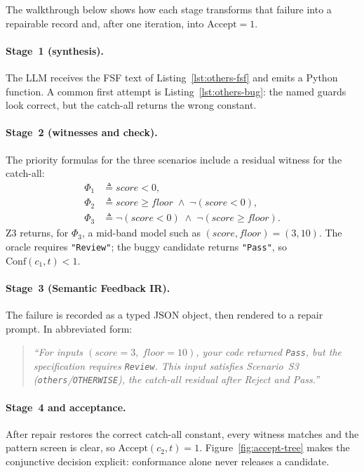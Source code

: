 The walkthrough below shows how each stage transforms that failure into a
repairable record and, after one iteration, into $\mathrm{Accept}=1$.

\paragraph{Stage~1 (synthesis).}
The LLM receives the FSF text of Listing~\ref{lst:others-fsf} and emits a
Python function.
A common first attempt is Listing~\ref{lst:others-bug}: the named guards look
correct, but the catch-all returns the wrong constant.

\paragraph{Stage~2 (witnesses and check).}
The priority formulas for the three scenarios include a residual witness for
the catch-all:
\begin{align}
  \Phi_1 &\triangleq \mathit{score}<0, \\
  \Phi_2 &\triangleq \mathit{score}\ge\mathit{floor}
           \;\land\; \neg(\mathit{score}<0), \\
  \Phi_3 &\triangleq \neg(\mathit{score}<0)
           \;\land\; \neg(\mathit{score}\ge\mathit{floor}).
  \label{eq:phi-catchall}
\end{align}
Z3 returns, for $\Phi_3$, a mid-band model such as $(\mathit{score},\mathit{floor})=(3,10)$.
The oracle requires \texttt{"Review"}; the buggy candidate returns
\texttt{"Pass"}, so $\mathrm{Conf}(c_1,t)<1$.

\paragraph{Stage~3 (Semantic Feedback IR).}
The failure is recorded as a typed JSON object, then rendered to a repair
prompt.  In abbreviated form:
\begin{quote}
\textit{``For inputs $(\mathit{score}{=}3,\;\mathit{floor}{=}10)$,
your code returned \texttt{Pass}, but the specification requires
\texttt{Review}.
This input satisfies Scenario~S3 (\texttt{others}/\texttt{OTHERWISE}), the
catch-all residual after Reject and Pass.''}
\end{quote}

\paragraph{Stage~4 and acceptance.}
After repair restores the correct catch-all constant, every witness matches and
the pattern screen is clear, so $\mathrm{Accept}(c_2,t)=1$.
Figure~\ref{fig:accept-tree} makes the conjunctive decision explicit:
conformance alone never releases a candidate.

